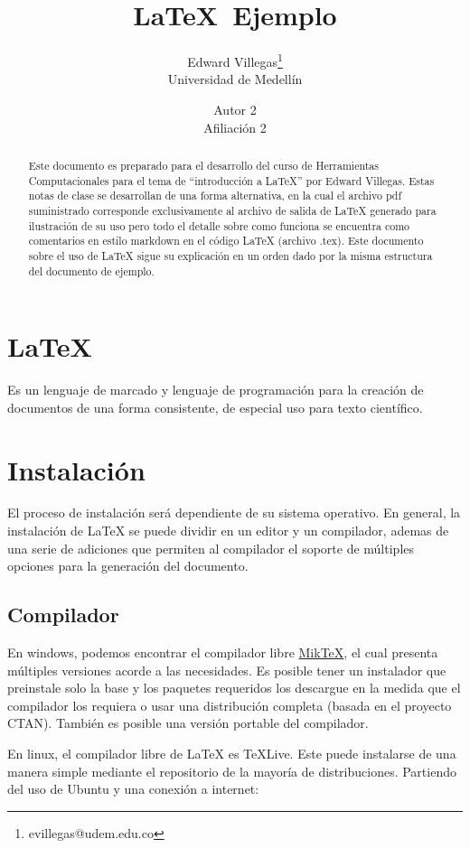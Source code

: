 \documentclass[12pt]{article}
\author{Edward Villegas\thanks{evillegas@udem.edu.co}\\Universidad de Medellín \and Autor 2\\Afiliación 2}
\title{\LaTeX \ Ejemplo}
\begin{document}
\maketitle

\begin{abstract}
Este documento es preparado para el desarrollo del curso de Herramientas Computacionales para el tema de ``introducción a LaTeX'' por Edward Villegas. Estas notas de clase se desarrollan de una forma alternativa, en la cual el archivo pdf suministrado corresponde exclusivamente al archivo de salida de LaTeX generado para ilustración de su uso pero todo el detalle sobre como funciona se encuentra como comentarios en estilo markdown en el código LaTeX (archivo .tex).
Este documento sobre el uso de LaTeX sigue su explicación en un orden dado por la misma estructura del documento de ejemplo.
\end{abstract}

\section{\LaTeX}
Es un lenguaje de marcado y lenguaje de programación para la creación de documentos de una forma consistente, de especial uso para texto científico.

\section{Instalación}

El proceso de instalación será dependiente de su sistema operativo. En general, la instalación de LaTeX se puede dividir en un editor y un compilador, ademas de una serie de adiciones que permiten al compilador el soporte de múltiples opciones para la generación del documento.

\subsection{Compilador}

En windows, podemos encontrar el compilador libre \href{http://miktex.org/}{MikTeX}, el cual presenta múltiples versiones acorde a las necesidades. Es posible tener un instalador que preinstale solo la base y los paquetes requeridos los descargue en la medida que el compilador los requiera o usar una distribución completa (basada en el proyecto CTAN). También es posible una versión portable del compilador.

En linux, el compilador libre de LaTeX es TeXLive. Este puede instalarse de una manera simple mediante el repositorio de la mayoría de distribuciones. Partiendo del uso de Ubuntu y una conexión a internet:
\end{document}
